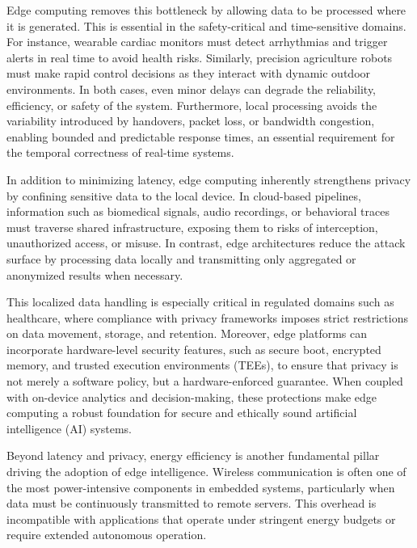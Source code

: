         Edge computing removes this bottleneck by allowing data to be processed where it is generated. This is essential in the safety-critical and time-sensitive domains. For instance, wearable cardiac monitors must detect arrhythmias and trigger alerts in real time to avoid health risks. Similarly, precision agriculture robots must make rapid control decisions as they interact with dynamic outdoor environments. In both cases, even minor delays can degrade the reliability, efficiency, or safety of the system. Furthermore, local processing avoids the variability introduced by handovers, packet loss, or bandwidth congestion, enabling bounded and predictable response times, an essential requirement for the temporal correctness of real-time systems.

        In addition to minimizing latency, edge computing inherently strengthens privacy by confining sensitive data to the local device. In cloud-based pipelines, information such as biomedical signals, audio recordings, or behavioral traces must traverse shared infrastructure, exposing them to risks of interception, unauthorized access, or misuse. In contrast, edge architectures reduce the attack surface by processing data locally and transmitting only aggregated or anonymized results when necessary.
        
        This localized data handling is especially critical in regulated domains such as healthcare, where compliance with privacy frameworks imposes strict restrictions on data movement, storage, and retention. Moreover, edge platforms can incorporate hardware-level security features, such as secure boot, encrypted memory, and trusted execution environments (TEEs), to ensure that privacy is not merely a software policy, but a hardware-enforced guarantee. When coupled with on-device analytics and decision-making, these protections make edge computing a robust foundation for secure and ethically sound artificial intelligence (AI) systems.

        Beyond latency and privacy, energy efficiency is another fundamental pillar driving the adoption of edge intelligence. Wireless communication is often one of the most power-intensive components in embedded systems, particularly when data must be continuously transmitted to remote servers. This overhead is incompatible with applications that operate under stringent energy budgets or require extended autonomous operation.
        

